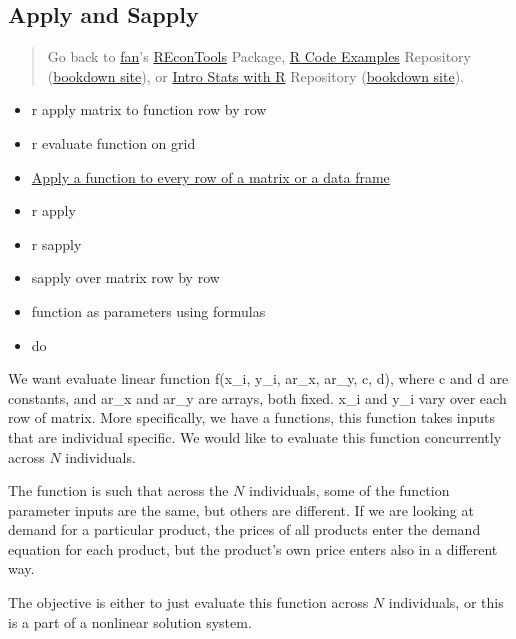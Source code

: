 \documentclass[
]{book}
\providecommand{\tightlist}{%
  \setlength{\itemsep}{0pt}\setlength{\parskip}{0pt}}
\begin{document}
\hypertarget{apply-and-sapply}{%
\subsection{Apply and Sapply}\label{apply-and-sapply}}

\begin{quote}
Go back to \href{http://fanwangecon.github.io/}{fan}'s \href{https://fanwangecon.github.io/REconTools/}{REconTools} Package, \href{https://fanwangecon.github.io/R4Econ/}{R Code Examples} Repository (\href{https://fanwangecon.github.io/R4Econ/bookdown}{bookdown site}), or \href{https://fanwangecon.github.io/Stat4Econ/}{Intro Stats with R} Repository (\href{https://fanwangecon.github.io/Stat4Econ/bookdown}{bookdown site}).
\end{quote}

\begin{itemize}
\tightlist
\item
  r apply matrix to function row by row
\item
  r evaluate function on grid
\item
  \href{https://stackoverflow.com/questions/4236368/apply-a-function-to-every-row-of-a-matrix-or-a-data-frame}{Apply a function to every row of a matrix or a data frame}
\item
  r apply
\item
  r sapply
\item
  sapply over matrix row by row
\item
  function as parameters using formulas
\item
  do
\end{itemize}

We want evaluate linear function f(x\_i, y\_i, ar\_x, ar\_y, c, d), where c and d are constants, and ar\_x and ar\_y are arrays, both fixed. x\_i and y\_i vary over each row of matrix. More specifically, we have a functions, this function takes inputs that are individual specific. We would like to evaluate this function concurrently across \(N\) individuals.

The function is such that across the \(N\) individuals, some of the function parameter inputs are the same, but others are different. If we are looking at demand for a particular product, the prices of all products enter the demand equation for each product, but the product's own price enters also in a different way.

The objective is either to just evaluate this function across \(N\) individuals, or this is a part of a nonlinear solution system.
\end{document}
